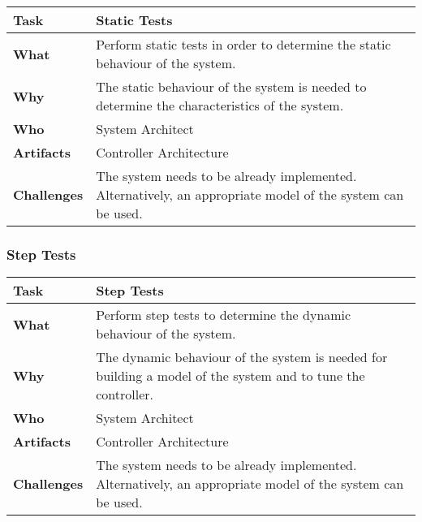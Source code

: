 \begin{tabularx}{\textwidth}{@{} l X @{}}
	\caption{Static Tests} \label{table:ch6_Task_Static_Tests}\\
	\toprule 
	\bfseries Task & Static Tests\\
	\midrule 
	\bfseries What & Perform static tests in order to determine the static behaviour of the system.\\
	\midrule 
	\bfseries Why & The static behaviour of the system is needed to determine the characteristics of the system.\\
	\midrule 
	\bfseries Who & System Architect\\
	\midrule 
	\bfseries Artifacts & Controller Architecture\\
	\midrule 
	\bfseries Challenges & The system needs to be already implemented. Alternatively, an appropriate model of the system can be used.
	\\
	\bottomrule
\end{tabularx}


\subsubsection{Step Tests}

\begin{tabularx}{\textwidth}{@{} l X @{}}
	\caption{Step Tests} \label{table:ch6_Task_Step_Tests}\\
	\toprule 
	\bfseries Task & Step Tests\\
	\midrule 
	\bfseries What & Perform step tests to determine the dynamic behaviour of the system.\\
	\midrule 
	\bfseries Why & The dynamic behaviour of the system is needed for building a model of the system and to tune the controller.\\
	\midrule 
	\bfseries Who & System Architect\\
	\midrule 
	\bfseries Artifacts & Controller Architecture\\
	\midrule 
	\bfseries Challenges & The system needs to be already implemented. Alternatively, an appropriate model of the system can be used.
	\\
	\bottomrule 
\end{tabularx}


